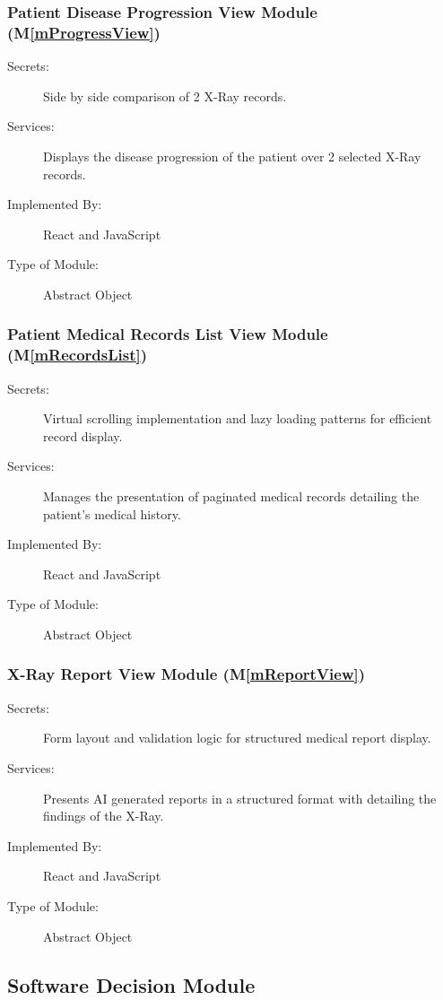 \documentclass[12pt, titlepage]{article}
\newcommand{\mref}[1]{M\ref{#1}}
\begin{document}
\subsubsection{Patient Disease Progression View Module (\mref{mProgressView})}
\begin{description}
\item[Secrets:] Side by side comparison of 2 X-Ray records.
\item[Services:] Displays the disease progression of the patient over 2 selected X-Ray records.
\item[Implemented By:] React and JavaScript
\item[Type of Module:] Abstract Object
\end{description}

\subsubsection{Patient Medical Records List View Module (\mref{mRecordsList})}
\begin{description}
\item[Secrets:] Virtual scrolling implementation and lazy loading patterns for efficient record display.
\item[Services:] Manages the presentation of paginated medical records detailing the patient's medical history.
\item[Implemented By:] React and JavaScript
\item[Type of Module:] Abstract Object
\end{description}

\subsubsection{X-Ray Report View Module (\mref{mReportView})}
\begin{description}
\item[Secrets:] Form layout and validation logic for structured medical report display.
\item[Services:] Presents AI generated reports in a structured format with detailing the findings of the X-Ray.
\item[Implemented By:] React and JavaScript
\item[Type of Module:] Abstract Object
\end{description}


\subsection{Software Decision Module}
\end{document}
